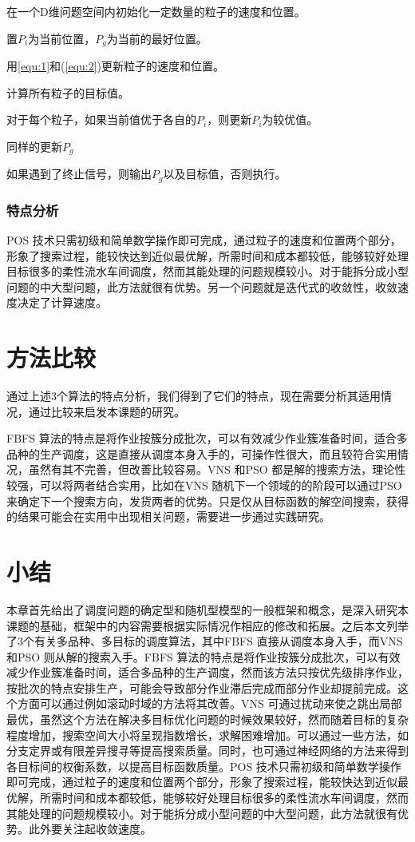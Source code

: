 \begin{asparaenum}
\renewcommand{\labelenumi}{\heiti 步骤\theenumi~}
\item 在一个D维问题空间内初始化一定数量的粒子的速度和位置。
\item 置$P_i$为当前位置，$P_g$为当前的最好位置。
\item 用\eqref{equ:1}和(\ref{equ:2})更新粒子的速度和位置。
\item 计算所有粒子的目标值。
\item 对于每个粒子，如果当前值优于各自的$P_i$，则更新$P_i$为较优值。
\item 同样的更新$P_g$
\item 如果遇到了终止信号，则输出$P_g$以及目标值，否则执行。
\end{asparaenum}

\subsubsection{特点分析}
POS 技术只需初级和简单数学操作即可完成，通过粒子的速度和位置两个部分，形象了搜索过程，能较快达到近似最优解，所需时间和成本都较低，能够较好处理目标很多的柔性流水车间调度，然而其能处理的问题规模较小。对于能拆分成小型问题的中大型问题，此方法就很有优势。另一个问题就是迭代式的收敛性，收敛速度决定了计算速度。
\section{方法比较}
通过上述3个算法的特点分析，我们得到了它们的特点，现在需要分析其适用情况，通过比较来启发本课题的研究。

FBFS 算法的特点是将作业按簇分成批次，可以有效减少作业簇准备时间，适合多品种的生产调度，这是直接从调度本身入手的，可操作性很大，而且较符合实用情况，虽然有其不完善，但改善比较容易。VNS 和PSO 都是解的搜索方法，理论性较强，可以将两者结合实用，比如在VNS 随机下一个领域的的阶段可以通过PSO 来确定下一个搜索方向，发货两者的优势。只是仅从目标函数的解空间搜索，获得的结果可能会在实用中出现相关问题，需要进一步通过实践研究。

\section{小结}
本章首先给出了调度问题的确定型和随机型模型的一般框架和概念，是深入研究本课题的基础，框架中的内容需要根据实际情况作相应的修改和拓展。之后本文列举了3个有关多品种、多目标的调度算法，其中FBFS 直接从调度本身入手，而VNS 和PSO 则从解的搜索入手。FBFS 算法的特点是将作业按簇分成批次，可以有效减少作业簇准备时间，适合多品种的生产调度，然而该方法只按优先级排序作业，按批次的特点安排生产，可能会导致部分作业滞后完成而部分作业却提前完成。这个方面可以通过例如滚动时域的方法将其改善。VNS 可通过扰动来使之跳出局部最优，虽然这个方法在解决多目标优化问题的时候效果较好，然而随着目标的复杂程度增加，搜索空间大小将呈现指数增长，求解困难增加。可以通过一些方法，如分支定界或有限差异搜寻等提高搜索质量。同时，也可通过神经网络的方法来得到各目标间的权衡系数，以提高目标函数质量。POS 技术只需初级和简单数学操作即可完成，通过粒子的速度和位置两个部分，形象了搜索过程，能较快达到近似最优解，所需时间和成本都较低，能够较好处理目标很多的柔性流水车间调度，然而其能处理的问题规模较小。对于能拆分成小型问题的中大型问题，此方法就很有优势。此外要关注起收敛速度。